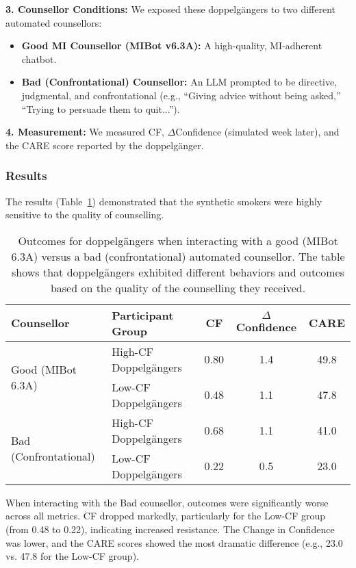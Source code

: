 \textbf{3. Counsellor Conditions:} We exposed these doppelgängers to two different automated counsellors:
\begin{itemize}
    \item \textbf{Good MI Counsellor (MIBot v6.3A):} A high-quality, MI-adherent chatbot.
    \item \textbf{Bad (Confrontational) Counsellor:} An LLM prompted to be directive, judgmental, and confrontational (e.g., ``Giving advice without being asked,'' ``Trying to persuade them to quit...'').
\end{itemize}

\textbf{4. Measurement:} We measured CF, $\Delta$Confidence (simulated week later), and the CARE score reported by the doppelgänger.

\subsubsection{Results}

The results (Table~\ref{tab:good-vs-bad-counselling}) demonstrated that the synthetic smokers were highly sensitive to the quality of counselling.

\begin{table}[h!]
\centering
\caption[Doppelgänger Outcomes with Good vs. Bad Counselling]{Outcomes for doppelgängers when interacting with a good (MIBot 6.3A) versus a bad (confrontational) automated counsellor. The table shows that doppelgängers exhibited different behaviors and outcomes based on the quality of the counselling they received.}
\label{tab:good-vs-bad-counselling}
\begin{tabular}{@{}llccc@{}}
\toprule
\textbf{Counsellor} & \textbf{Participant Group} & \textbf{CF} & \textbf{$\Delta$Confidence} & \textbf{CARE} \\ \midrule
\multirow{2}{*}{Good (MIBot 6.3A)} & High-CF Doppelgängers & 0.80 & 1.4 & 49.8 \\
 & Low-CF Doppelgängers & 0.48 & 1.1 & 47.8 \\ \midrule
\multirow{2}{*}{Bad (Confrontational)} & High-CF Doppelgängers & 0.68 & 1.1 & 41.0 \\
 & Low-CF Doppelgängers & 0.22 & 0.5 & 23.0 \\ \bottomrule
\end{tabular}
\end{table}

When interacting with the Bad counsellor, outcomes were significantly worse across all metrics. CF dropped markedly, particularly for the Low-CF group (from 0.48 to 0.22), indicating increased resistance. The Change in Confidence was lower, and the CARE scores showed the most dramatic difference (e.g., 23.0 vs. 47.8 for the Low-CF group).

